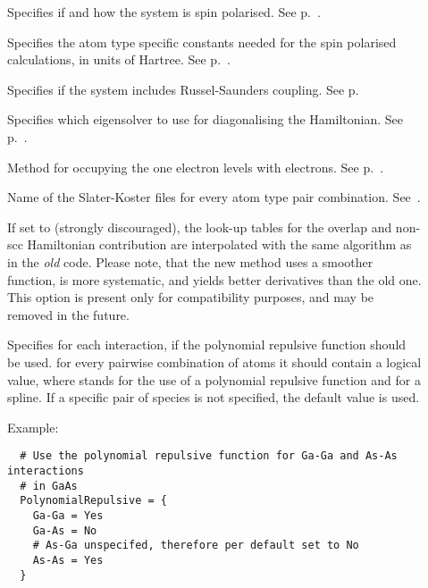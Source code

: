 \begin{description}
\item[] Specifies if and how the system is spin
  polarised. See p.~.

\item[] Specifies the atom type specific constants needed for
  the spin polarised calculations, in units of Hartree.  See
  p.~.

\item[] Specifies if the system includes Russel-Saunders
  coupling. See p.~

\item[] Specifies which eigensolver to use for
  diagonalising the Hamiltonian. See p.~.

\item[] Method for occupying the one electron levels with
  electrons. See p.~.

\item[] Name of the Slater-Koster files for every atom
  type pair combination. See~.

\item[] If set to  (strongly
  discouraged), the look-up tables for the overlap and non-scc
  Hamiltonian contribution are interpolated with the same algorithm as
  in the \emph{old} {\dftb} code. Please note, that the new method
  uses a smoother function, is more systematic, and yields better
  derivatives than the old one.  This option is present only for
  compatibility purposes, and may be removed in the future.

\item[] Specifies for each interaction, if the
  polynomial repulsive function should be used. for every pairwise
  combination of atoms it should contain a logical value, where
   stands for the use of a polynomial repulsive function and
   for a spline. If a specific pair of species is not
  specified, the default value  is used.

  Example:
\begin{verbatim}
  # Use the polynomial repulsive function for Ga-Ga and As-As interactions
  # in GaAs
  PolynomialRepulsive = {
    Ga-Ga = Yes
    Ga-As = No
    # As-Ga unspecifed, therefore per default set to No
    As-As = Yes
  }
\end{verbatim}


\end{description}
